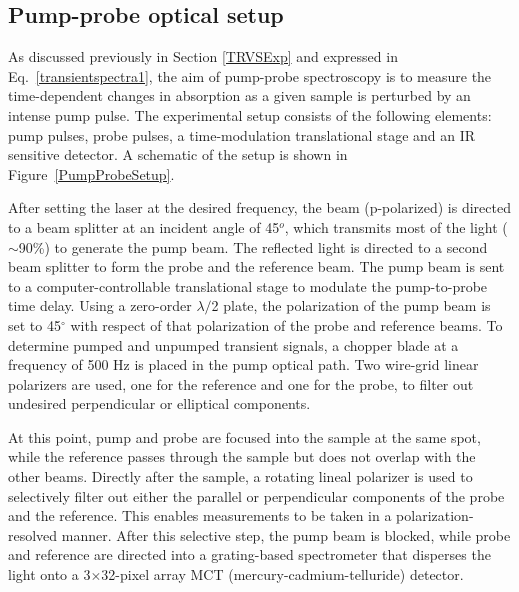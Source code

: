 \subsection{Pump-probe optical setup}

As discussed previously in Section \ref{TRVSExp} and expressed in Eq.\ \ref{transientspectra1}, the aim of pump-probe spectroscopy is to measure the time-dependent changes in absorption as a given sample is perturbed by an intense pump pulse. The experimental setup consists of the following elements: pump pulses, probe pulses, a time-modulation translational stage and an IR sensitive detector. A schematic of the setup is shown in Figure~\ref{PumpProbeSetup}.

After setting the laser at the desired frequency, the beam (p-polarized) is directed to a  beam splitter at an incident angle of 45$^o$, which transmits most of the light ($\sim$90\%) to generate the pump beam. The reflected light is directed to a second  beam splitter to form the probe and the reference beam. The pump beam is sent to a computer-controllable translational stage to modulate the pump-to-probe time delay. Using a zero-order $\lambda /$2 plate, the polarization of the pump beam is set to 45$^\circ$ with respect of that polarization of the probe and reference beams. To determine pumped and unpumped transient signals, a chopper blade at a frequency of 500 Hz is placed in the pump optical path. Two wire-grid linear polarizers are used, one for the reference and one for the probe, to filter out undesired perpendicular or elliptical components. 


At this point, pump and probe are focused into the sample at the same spot, while the reference passes through the sample but does not overlap with the other beams. Directly after the sample, a rotating lineal polarizer is used to selectively filter out either the parallel or perpendicular components of the probe and the reference. This enables measurements to be taken in a polarization-resolved manner. After this selective step, the pump beam is blocked, while probe and reference are directed into a grating-based spectrometer that disperses the light onto a 3$\times$32-pixel array MCT (mercury-cadmium-telluride) detector.


